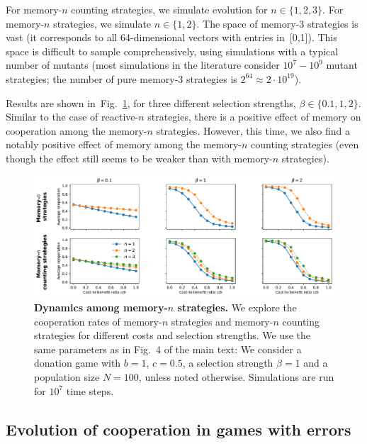 \documentclass[9pt,twoside,lineno]{pnas-new}
\theoremstyle{plainCl1}
\theoremstyle{plainCl2}
\begin{document}
For memory-$n$ counting strategies, we simulate evolution for $n\!\in\!\{1,2,3\}$.
For memory-$n$ strategies, we simulate $n\!\in\!\{1,2\}$. 
The space of memory-3 strategies is vast (it corresponds to all 64-dimensional vectors with entries in~[0,1]). 
This space is difficult to sample comprehensively, using simulations with a typical number of mutants (most simulations in the literature consider $10^7-10^9$ mutant strategies; the number of pure memory-3 strategies is $2^{64}\approx 2\!\cdot\! 10^{19}$). 

Results are shown in~Fig.~\ref{Fig:MemoryN}, for three different selection strengths, $\beta\!\in\!\{0.1,1,2\}$. 
Similar to the case of reactive-$n$ strategies, there is a positive effect of memory on cooperation among the memory-$n$ strategies. 
However, this time, we also find a notably positive effect of memory among the memory-$n$ counting strategies (even though the effect still seems to be weaker than with memory-$n$ strategies). 

\begin{figure}[t]
  \centering
  \includegraphics[width=.9\textwidth]{../../figures/siFigMemorySim.pdf}
  \caption{
  \textbf{Dynamics among memory-$n$ strategies.}
  We explore the cooperation rates of memory-$n$ strategies and memory-$n$ counting strategies for different costs and selection strengths.
  We use the same parameters as in Fig.~4 of the main text: We consider a donation game with \(b\!=\!1\),  \(c\!=\!0.5\), a selection strength $\beta\!=\!1$ and a population size $N\!=\!100$, unless noted otherwise. 
  Simulations are run for \(10 ^ 7\) time steps.}
  \label{Fig:MemoryN}
\end{figure}



\subsection{Evolution of cooperation in games with errors}
\end{document}
